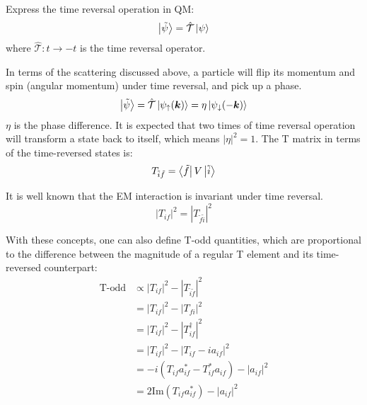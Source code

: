 Express the time reversal operation in QM:
\begin{equation}
    \ket{\tilde{\psi}} = \hat{\mathcal{T}} \ket{\psi} 
\end{equation}
where $\hat{\mathcal{T}}: t \rightarrow -t$ is the time reversal operator. 

In terms of the scattering discussed above, a particle will flip its momentum 
and spin (angular momentum) under time reversal, and pick up a phase.
\begin{equation}
    \ket{\tilde{\psi}} = \hat{\mathcal{T}} \ket{\psi_\uparrow(\boldsymbol{k})} = \eta\ket{\psi_\downarrow(-\boldsymbol{k})}
\end{equation}
$\eta$ is the phase difference. It is expected that two times of time reversal operation 
will transform a state back to itself, which means $|\eta|^2 = 1$. 
The T matrix in terms of the time-reversed states is:
\begin{equation}
    T_{\tilde{i}\tilde{f}} = \bra{\tilde{f}} V \ket{\tilde{i}}
\end{equation}

It is well known that the EM interaction is invariant under time reversal.
\begin{equation}
    |T_{if}|^2 = |T_{\tilde{f}\tilde{i}}|^2 
\end{equation}

With these concepts, one can also define T-odd quantities, which
are proportional to the difference between the magnitude of a regular T element and 
its time-reversed counterpart:
\begin{equation}
    \begin{aligned}
	\text{T-odd} &\propto |T_{if}|^2 - |T_{\tilde{i}\tilde{f}}|^2	\\
	    &= |T_{if}|^2 - |T_{fi}|^2	\\
	    &= |T_{if}|^2 - |T^\dag_{if}|^2	\\
	    &= |T_{if}|^2 - |T_{if} - ia_{if}|^2	\\
	    &= -i(T_{if}a^*_{if} - T^*_{if}a_{if}) - |a_{if}|^2	\\
	    &= 2\text{Im}(T_{if}a^*_{if}) - |a_{if}|^2
    \end{aligned}
    \label{eq:T-odd}
\end{equation}

